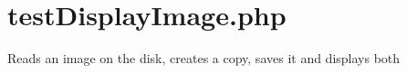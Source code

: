 \hypertarget{test_display_image_8php-example}{
\section{test\-Display\-Image.\-php}
}
\-Reads an image on the disk, creates a copy, saves it and displays both


\begin{DoxyCodeInclude}
\end{DoxyCodeInclude}
 